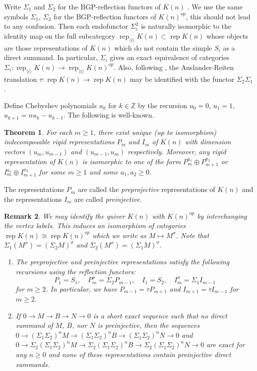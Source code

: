 \documentclass{amsart}
\newtheorem{theorem}{Theorem}[section]
\newtheorem{remark}[theorem]{Remark}
\numberwithin{equation}{section}
\newcommand{\rep}{\operatorname{rep}}
\newcommand{\ZZ}{\mathbb{Z}}
\newcommand{\ses}[3]{0\rightarrow #1\rightarrow #2\rightarrow#3\rightarrow 0}
\begin{document}
Write $\Sigma_1$ and $\Sigma_2$ for the BGP-reflection functors of $K(n)$ \cite{bgp}. 
We use the same symbols $\Sigma_1$, $\Sigma_2$ for the BGP-reflection functors of $K(n)^{op}$, this should not lead to any confusion. 
Then each endofunctor $\Sigma_i^2$ is naturally isomorphic to the identity map on the full subcategory $\rep_{\langle i\rangle} K(n)\subset \rep K(n)$ whose objects are those representations of $K(n)$ which do not contain the simple $S_i$ as a direct summand.
In particular, $\Sigma_i$ gives an exact equivalence of categories $\Sigma_i:\rep_{\langle i\rangle} K(n)\to\rep_{\langle i\rangle} K(n)^{op}$.
Also, following \cite{brenner-butler}, the Auslander-Reiten translation $\tau:\rep K(n)\to\rep K(n)$ may be identified with the functor $\Sigma_2\Sigma_1$.

Define Chebyshev polynomials $u_k$ for $k\in\ZZ$ by the recursion $u_0=0$, $u_1=1$, $u_{k+1}=nu_k-u_{k-1}$.
The following is well-known.
\begin{theorem}
  \label{th:rigids}
  For each $m\ge1$, there exist unique (up to isomorphism) indecomposable rigid representations $P_m$ and $I_m$ of $K(n)$ with dimension vectors $(u_m,u_{m-1})$ and $(u_{m-1},u_m)$ respectively. 
  Moreover, any rigid representation of $K(n)$ is isomorphic to one of the form $P_m^{a_1}\oplus P_{m+1}^{a_2}$ or $I_m^{a_1}\oplus I_{m+1}^{a_2}$ for some $m\ge1$ and some $a_1,a_2\ge0$.
\end{theorem}
The representations $P_m$ are called the \emph{preprojective} representations of $K(n)$ and the representations $I_m$ are called \emph{preinjective}.
\begin{remark}
  \label{rem:reflection recursion}
  We may identify the quiver $K(n)$ with $K(n)^{op}$ by interchanging the vertex labels.
  This induces an isomorphism of categories $\rep K(n)\cong\rep K(n)^{op}$ which we write as $M\mapsto M^\sigma$.
  Note that $\Sigma_1(M^\sigma)=(\Sigma_2 M)^\sigma$ and $\Sigma_2(M^\sigma)=(\Sigma_1 M)^\sigma$.
  \begin{enumerate}
    \item The preprojective and preinjective representations satisfy the following recursions using the reflection functors:
      \[P_1=S_1,\quad P_m^\sigma=\Sigma_2 P_{m-1},\quad I_1=S_2,\quad I_m^\sigma=\Sigma_1 I_{m-1}\]
      for $m\ge2$.
      In particular, we have $P_{m-1}=\tau P_{m+1}$ and $I_{m+1}=\tau I_{m-1}$ for $m\ge2$.
    \item If $\ses{M}{B}{N}$ is a short exact sequence such that no direct summand of $M$, $B$, nor $N$ is preinjective, then the sequences $\ses{(\Sigma_1\Sigma_2)^nM}{(\Sigma_1\Sigma_2)^nB}{(\Sigma_1\Sigma_2)^nN}$ and $\ses{\Sigma_2(\Sigma_1\Sigma_2)^nM}{\Sigma_2(\Sigma_1\Sigma_2)^nB}{\Sigma_2(\Sigma_1\Sigma_2)^nN}$ are exact for any $n\ge0$ and none of these representations contain preinjective direct summands.
  \end{enumerate}
\end{remark}
\end{document}

